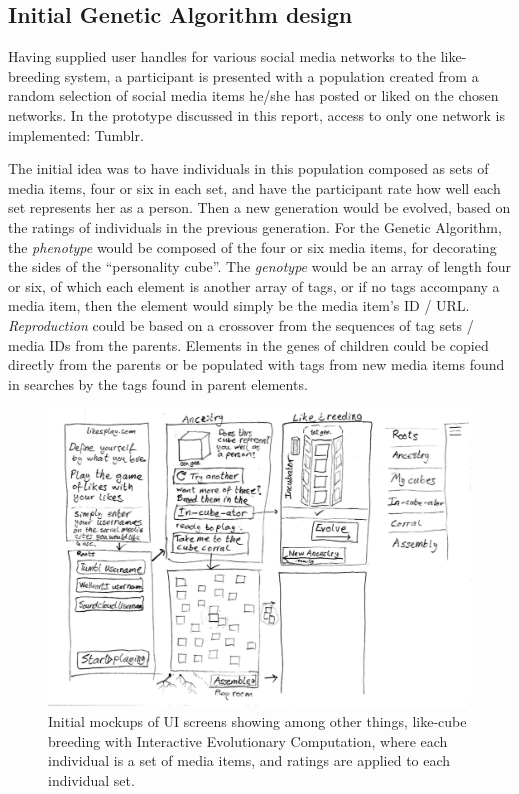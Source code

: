 \documentclass[]{article}
\begin{document}
\subsection{Initial Genetic Algorithm design}

Having supplied user handles for various social media networks to the like-breeding system, a participant is presented with a population created from a random selection of social media items he/she has posted or liked on the chosen networks.  In the prototype discussed in this report, access to only one network is implemented:  Tumblr.

The initial idea was to have individuals in this population composed as sets of media items, four or six in each set, and have the participant rate how well each set represents her as a person.  Then a new generation would be evolved, based on the ratings of individuals in the previous generation.  For the Genetic Algorithm, the \textit{phenotype} would be composed of the four or six media items, for decorating the sides of the “personality cube”.  
The \textit{genotype} would be an array of length four or six, of which each element is another array of tags, or if no tags accompany a media item, then the element would simply be the media item's ID / URL.
\textit{Reproduction} could be based on a crossover from the sequences of tag sets / media IDs from the parents.  
Elements in the genes of children could be copied directly from the parents or be populated with tags from new media items found in searches by the tags found in parent elements.
\begin{figure}[h!]
	\centerline{\includegraphics[width=\columnwidth]{breederUImockup.png}}
	\caption{Initial mockups of UI screens showing among other things, like-cube breeding with Interactive Evolutionary Computation, where each individual is a set of media items, and ratings are applied to each individual set.}
	\label{fig:breedingMockup}
\end{figure}
\end{document}
